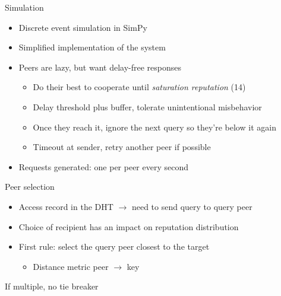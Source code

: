 \documentclass[presentation,english,usenames,dvipsnames]{beamer}
\begin{document}
\begin{frame}{Simulation}
  \begin{itemize}
    \item Discrete event simulation in SimPy
    \item Simplified implementation of the system

    \pause

    \item Peers are lazy, but want delay-free responses
    \begin{itemize}
      \item Do their best to cooperate until \emph{saturation reputation} (14)
      \item Delay threshold plus buffer, tolerate unintentional misbehavior

      \pause

      \item Once they reach it, ignore the next query so they're below it again
      \item Timeout at sender, retry another peer if possible
    \end{itemize}

    \pause

    \item Requests generated: one per peer every second
  \end{itemize}
\end{frame}

\begin{frame}{Peer selection}
  \begin{itemize}
    \item Access record in the DHT $\rightarrow$ need to send query to query
    peer
    \item Choice of recipient has an impact on reputation distribution

    \pause

    \item First rule: select the query peer closest to the target
    \begin{itemize}
      \item Distance metric peer $\rightarrow$ key
    \end{itemize}
  \end{itemize}

    \pause

  \begin{block}{}
    If multiple, no tie breaker
  \end{block}
\end{frame}
\end{document}
